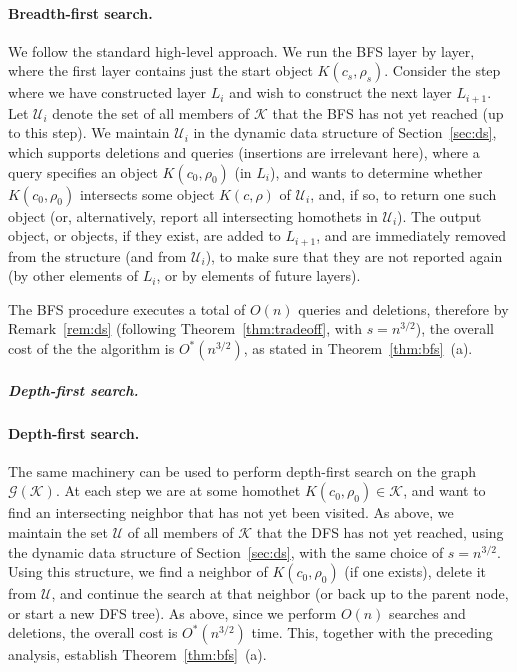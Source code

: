 \documentclass[11pt]{article}
\def\G{\mathcal{G}}
\def\K{\mathcal{K}}
\def\U{\mathcal{U}}
\theoremstyle{definition}
\begin{document}
\paragraph{Breadth-first search.}
\fi
We follow the standard high-level approach. We run the BFS layer by layer, where the first layer
contains just the start object $K(c_s,\rho_s)$. Consider the step where we have constructed layer 
$L_i$ and wish to construct the next layer $L_{i+1}$. Let $\U_i$ denote the set of all members of 
$\K$ that the BFS has not yet reached (up to this step). We maintain $\U_i$ in the dynamic data 
structure of Section~\ref{sec:ds}, which supports deletions and queries (insertions are irrelevant 
here), where a query specifies an object $K(c_0,\rho_0)$ 
(in $L_i$), and wants to determine whether $K(c_0,\rho_0)$ intersects some object $K(c,\rho)$ of 
$\U_i$, and, if so, to return one such object (or, alternatively, report all intersecting homothets
in $\U_i$). The output object, or objects, if they exist, are added to $L_{i+1}$,
and are immediately removed from the structure (and from $\U_i$), to make sure that they are not reported 
again (by other elements of $L_i$, or by elements of future layers).

The BFS procedure executes a total of $O(n)$ queries and deletions, therefore by Remark~\ref{rem:ds} 
(following Theorem~\ref{thm:tradeoff}, with $s=n^{3/2}$),
the overall cost of the the algorithm is $O^*(n^{3/2})$, as stated in
Theorem~\ref{thm:bfs}~(a).

\ifsocgproc
\subparagraph*{Depth-first search.}
\else
\paragraph{Depth-first search.}
\fi
The same machinery can be used to perform depth-first search on the graph $\G(\K)$.
At each step we are at some homothet $K(c_0,\rho_0)\in\K$, and want to find an intersecting neighbor 
that has not yet been visited. As above, we maintain the set $\U$ of all members of $\K$ that 
the DFS has not yet reached, using the dynamic data structure of Section~\ref{sec:ds}, with the
same choice of $s=n^{3/2}$. Using this structure, we find a neighbor of $K(c_0,\rho_0)$
(if one exists), delete it from $\U$, and continue the search at that neighbor (or back up
to the parent node, or start a new DFS tree). As above, since we perform
$O(n)$ searches and deletions, the overall cost is $O^*(n^{3/2})$ time. 
This, together with the preceding analysis, establish Theorem~\ref{thm:bfs}~(a).
\end{document}
